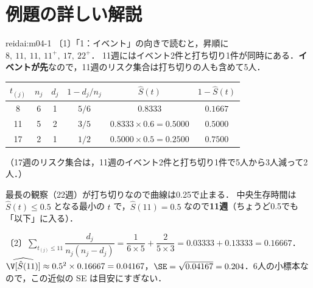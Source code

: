 \section{例題の詳しい解説}\label{sec:m04-kaisetsu}
\begin{kaitou}{reidai:m04-1}
〔1〕「1：イベント」の向きで読むと，昇順に $8,\ 11,\ 11,\ 11^+,\ 17,\ 22^+$．
11週にはイベント2件と打ち切り1件が同時にある．\textbf{イベントが先}なので，11週のリスク集合は打ち切りの人も含めて5人．
\begin{center}\small
\begin{tabular}{@{}cccccc@{}}
\toprule
$t_{(j)}$ & $n_j$ & $d_j$ & $1-d_j/n_j$ & $\hat S(t)$ & $1-\hat S(t)$\\
\midrule
8 & 6 & 1 & $5/6$ & $0.8333$ & $0.1667$\\
11 & 5 & 2 & $3/5$ & $0.8333\times0.6=0.5000$ & $0.5000$\\
17 & 2 & 1 & $1/2$ & $0.5000\times0.5=0.2500$ & $0.7500$\\
\bottomrule
\end{tabular}
\end{center}
（17週のリスク集合は，11週のイベント2件と打ち切り1件で5人から3人減って2人．）
\begin{center}
\end{center}
最長の観察（22週）が打ち切りなので曲線は0.25で止まる．
中央生存時間は $\hat S(t)\le0.5$ となる最小の $t$ で，$\hat S(11)=0.5$ なので\textbf{11週}（ちょうど0.5でも「以下」に入る）．

〔2〕$\sum_{t_{(j)}\le11}\dfrac{d_j}{n_j(n_j-d_j)}=\dfrac1{6\times5}+\dfrac2{5\times3}=0.03333+0.13333=0.16667$．
$\widehat\V[\hat S(11)]\approx0.5^2\times0.16667=0.04167$，$\SE=\sqrt{0.04167}=0.204$．6人の小標本なので，この近似の SE は目安にすぎない．


\end{kaitou}
